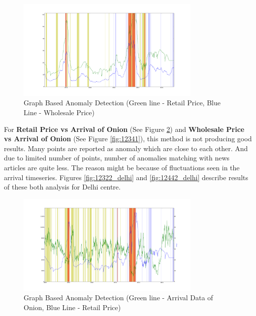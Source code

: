 \documentclass[a4paper,10pt]{report}
\begin{document}
			\begin{figure}[H]
		    	\centering
  		    	\includegraphics[width=0.8\textwidth]{graphs/12331.png}
		    	\caption{Graph Based Anomaly Detection (Green line - Retail Price, Blue Line - Wholesale Price)}
		    	\label{fig:12331}
			\end{figure}
	
	For \textbf{Retail Price vs Arrival of Onion} (See Figure \ref{fig:12321}) and \textbf{Wholesale Price vs Arrival of Onion} (See Figure \ref{fig:12341}), this method is not producing good results. Many points are reported as anomaly which are close to each other. And due to limited number of points, number of anomalies matching with news articles are quite less. The reason might be because of fluctuations seen in the arrival timeseries. Figures \ref{fig:12322_delhi} and \ref{fig:12442_delhi} describe results of these both analysis for Delhi centre.
			\begin{figure}[H]
		    	\centering
  		    	\includegraphics[width=0.8\textwidth]{graphs/12321.png}
		    	\caption{Graph Based Anomaly Detection (Green line - Arrival Data of Onion, Blue Line - Retail Price)}
		    	\label{fig:12321}
			\end{figure}
			
\end{document}
